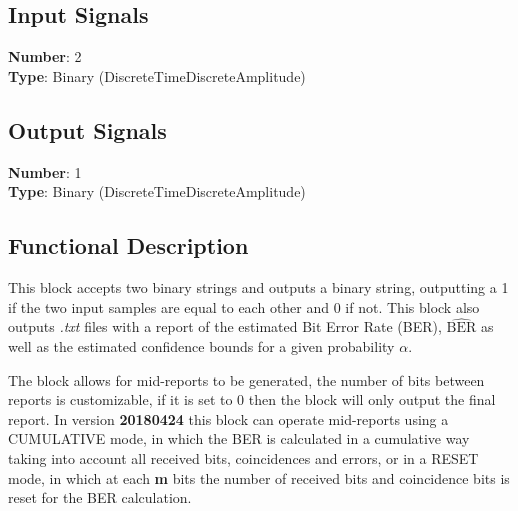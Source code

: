 \begin{refsection}
\subsection*{Input Signals}

\textbf{Number}: 2\\
\textbf{Type}: Binary (DiscreteTimeDiscreteAmplitude)


\subsection*{Output Signals}

\textbf{Number}: 1\\
\textbf{Type}: Binary (DiscreteTimeDiscreteAmplitude)

\subsection*{Functional Description}

This block accepts two binary strings and outputs a binary string, outputting a 1 if the two input samples are equal to each other and 0 if not. This block also outputs \textit{.txt} files with a report of the estimated Bit Error Rate (BER), $\widehat{\text{BER}}$ as well as the estimated confidence bounds for a given probability $\alpha$.
\par
The block allows for mid-reports to be generated, the number of bits between reports is customizable, if it is set to 0 then the block will only output the final report. In version \textbf{20180424} this block can operate mid-reports using a CUMULATIVE mode, in which the BER is calculated in a cumulative way taking into account all received bits, coincidences and errors, or in a RESET mode, in which at each \textbf{m} bits the number of received bits and coincidence bits is reset for the BER calculation.


\end{refsection}
